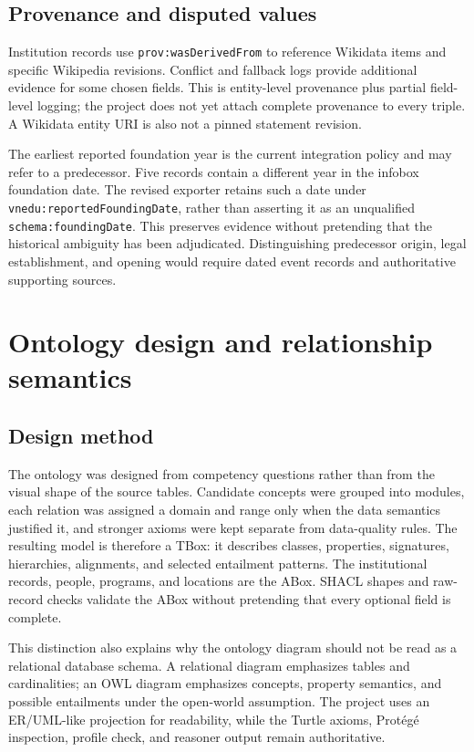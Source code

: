 \documentclass[11pt,a4paper]{article}
\newcommand{\term}[1]{\texttt{#1}}
\begin{document}
\subsection{Provenance and disputed values}
Institution records use \term{prov:wasDerivedFrom} to reference Wikidata items and
specific Wikipedia revisions. Conflict and fallback logs provide additional evidence for
some chosen fields. This is entity-level provenance plus partial field-level logging;
the project does not yet attach complete provenance to every triple. A Wikidata entity
URI is also not a pinned statement revision.

The earliest reported foundation year is the current integration policy and may refer to
a predecessor. Five records contain a different year in the infobox foundation date.
The revised exporter retains such a date under \term{vnedu:reportedFoundingDate}, rather
than asserting it as an unqualified \term{schema:foundingDate}. This preserves evidence
without pretending that the historical ambiguity has been adjudicated. Distinguishing
predecessor origin, legal establishment, and opening would require dated event records
and authoritative supporting sources.




\section{Ontology design and relationship semantics}
\subsection{Design method}
The ontology was designed from competency questions rather than from the visual shape of
the source tables. Candidate concepts were grouped into modules, each relation was assigned
a domain and range only when the data semantics justified it, and stronger axioms were kept
separate from data-quality rules. The resulting model is therefore a TBox: it describes
classes, properties, signatures, hierarchies, alignments, and selected entailment patterns.
The institutional records, people, programs, and locations are the ABox. SHACL shapes and
raw-record checks validate the ABox without pretending that every optional field is complete.

This distinction also explains why the ontology diagram should not be read as a relational
database schema. A relational diagram emphasizes tables and cardinalities; an OWL diagram
emphasizes concepts, property semantics, and possible entailments under the open-world
assumption. The project uses an ER/UML-like projection for readability, while the Turtle
axioms, Protégé inspection, profile check, and reasoner output remain authoritative.
\end{document}
